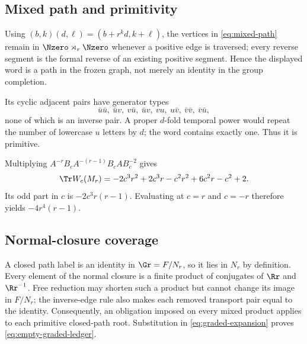 \subsection{Mixed path and primitivity}

Using $(b,k)(d,\ell)=(b+r^kd,k+\ell)$, the vertices in
\cref{eq:mixed-path} remain in $\Nzero\rtimes_r\Nzero$ whenever a positive
edge is traversed; every reverse segment is the formal reverse of an existing
positive segment.  Hence the displayed word is a path in the frozen graph,
not merely an identity in the group completion.

Its cyclic adjacent pairs have generator types
\[
  \bar u\bar u,\ \bar u v,\ v\bar u,\ \bar u v,\ vu,\ u\bar v,
  \ \bar v\bar v,\ \bar v\bar u,
\]
none of which is an inverse pair.  A proper $d$-fold temporal power would
repeat the number of lowercase $u$ letters by $d$; the word contains exactly
one.  Thus it is primitive.

Multiplying $A^{-r}B_cA^{-(r-1)}B_cAB_c^{-2}$ gives
\[
\Tr W_c(M_r)
=-2c^3r^2+2c^3r-c^2r^2+6c^2r-c^2+2.
\]
Its odd part in $c$ is $-2c^3r(r-1)$.  Evaluating at $c=r$ and $c=-r$
therefore yields $-4r^4(r-1)$.

\subsection{Normal-closure coverage}

A closed path label is an identity in $\Gr=F/N_r$, so it lies in $N_r$ by
definition.  Every element of the normal closure is a finite product of
conjugates of $\Rr$ and $\Rr^{-1}$.  Free reduction may shorten such a product
but cannot change its image in $F/N_r$; the inverse-edge rule also makes each
removed transport pair equal to the identity.  Consequently, an obligation
imposed on every mixed product applies to each primitive closed-path root.
Substitution in \cref{eq:graded-expansion} proves
\cref{eq:empty-graded-ledger}.
